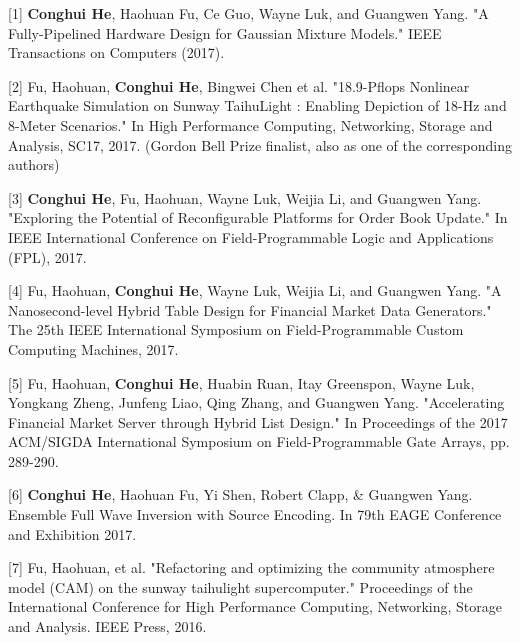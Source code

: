 \documentclass[11pt, a4paper]{awesome-cv}
\begin{document}


\begin{cvparagraph}

[1] \hspace{0.5mm} \textbf{Conghui He}, Haohuan Fu, Ce Guo, Wayne Luk, and Guangwen Yang. "A Fully-Pipelined Hardware Design for Gaussian Mixture Models." IEEE Transactions on Computers (2017).

[2] \hspace{0.5mm} Fu, Haohuan, \textbf{Conghui He}, Bingwei Chen et al. "18.9-Pflops Nonlinear Earthquake Simulation on Sunway TaihuLight : Enabling Depiction of 18-Hz and 8-Meter Scenarios." In High Performance Computing, Networking, Storage and Analysis, SC17, 2017. (Gordon Bell Prize finalist, also as one of the corresponding authors)

[3] \hspace{0.5mm} \textbf{Conghui He}, Fu, Haohuan, Wayne Luk, Weijia Li, and Guangwen Yang. "Exploring the Potential of Reconfigurable Platforms for Order Book Update." In IEEE International Conference on Field-Programmable Logic and Applications (FPL), 2017.

[4] \hspace{0.5mm} Fu, Haohuan, \textbf{Conghui He}, Wayne Luk, Weijia Li, and Guangwen Yang. "A Nanosecond-level Hybrid Table Design for Financial Market Data Generators." The 25th IEEE International Symposium on Field-Programmable Custom Computing Machines, 2017.

[5] \hspace{0.5mm} Fu, Haohuan, \textbf{Conghui He}, Huabin Ruan, Itay Greenspon, Wayne Luk, Yongkang Zheng, Junfeng Liao, Qing Zhang, and Guangwen Yang. "Accelerating Financial Market Server through Hybrid List Design." In Proceedings of the 2017 ACM/SIGDA International Symposium on Field-Programmable Gate Arrays, pp. 289-290. 

[6] \hspace{0.5mm} \textbf{Conghui He}, Haohuan Fu, Yi Shen, Robert Clapp, \& Guangwen Yang. Ensemble Full Wave Inversion with Source Encoding. In 79th EAGE Conference and Exhibition 2017.

[7] \hspace{0.5mm} Fu, Haohuan, et al. "Refactoring and optimizing the community atmosphere model (CAM) on the sunway taihulight supercomputer." Proceedings of the International Conference for High Performance Computing, Networking, Storage and Analysis. IEEE Press, 2016.


\end{cvparagraph}
\end{document}
